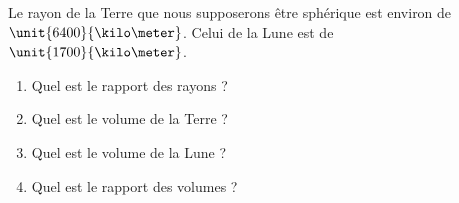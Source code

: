 
\begin{exercice}\label{exosmath-0093}

    Le rayon de la Terre que nous supposerons être sphérique est environ de \( \unit{6400}{\kilo\meter}\). Celui de la Lune est de \( \unit{1700}{\kilo\meter}\).
    \begin{multicols}{2}
    \begin{enumerate}
        \item
            Quel est le rapport des rayons ?
        \item
            Quel est le volume de la Terre ?
        \item
            Quel est le volume de la Lune ?
        \item
            Quel est le rapport des volumes ?
    \end{enumerate}
    \end{multicols}

\end{exercice}
